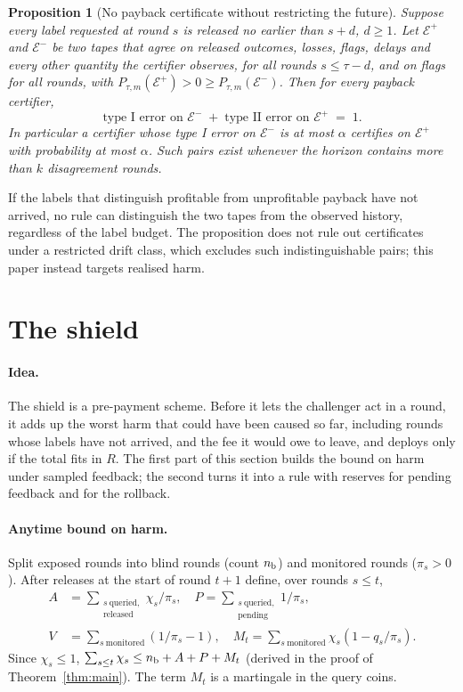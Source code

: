 \documentclass[10pt]{article}
\theoremstyle{plain}
\newtheorem{proposition}{Proposition}
\theoremstyle{definition}
\begin{document}
\begin{samepage}
\begin{proposition}[No payback certificate without restricting the future]\label{prop:nocert}
Suppose every label requested at round $s$ is released no earlier than $s+d$, $d\ge1$. Let $\mathcal E^+$ and $\mathcal E^-$ be two tapes that agree on released outcomes, losses, flags, delays and every other quantity the certifier observes, for all rounds $s\le\tau-d$, and on flags for all rounds, with $P_{\tau,m}(\mathcal E^+)>0\ge P_{\tau,m}(\mathcal E^-)$. Then for every payback certifier,
\[
\text{type I error on }\mathcal E^-\;+\;\text{type II error on }\mathcal E^+\;=\;1 .
\]
In particular a certifier whose type I error on $\mathcal E^-$ is at most $\alpha$ certifies on $\mathcal E^+$ with probability at most $\alpha$. Such pairs exist whenever the horizon contains more than $k$ disagreement rounds.
\end{proposition}
\end{samepage}
If the labels that distinguish profitable from unprofitable payback have not arrived, no rule can distinguish the two tapes from the observed history, regardless of the label budget. The proposition does not rule out certificates under a restricted drift class, which excludes such indistinguishable pairs; this paper instead targets realised harm.

\section{The shield}\label{sec:method}
\paragraph{Idea.}
The shield is a pre-payment scheme. Before it lets the challenger act in a round, it adds up the worst harm that could have been caused so far, including rounds whose labels have not arrived, and the fee it would owe to leave, and deploys only if the total fits in $R$. The first part of this section builds the bound on harm under sampled feedback; the second turns it into a rule with reserves for pending feedback and for the rollback.

\paragraph{Anytime bound on harm.}
Split exposed rounds into blind rounds (count $n_{\rm b}$) and monitored rounds ($\pi_s>0$). After releases at the start of round $t+1$ define, over rounds $s\le t$,
{\small\begin{align*}
A&=\sum_{\substack{s\ \text{queried,}\\ \text{released}}}\!\chi_s/\pi_s,\quad
P=\sum_{\substack{s\ \text{queried,}\\ \text{pending}}}\!1/\pi_s,\\
V&=\sum_{s\ \text{monitored}}(1/\pi_s-1),\quad
M_t=\sum_{s\ \text{monitored}}\chi_s(1-q_s/\pi_s).
\end{align*}}
Since $\chi_s\le1$, $\sum_{s\le t}\chi_s\le n_{\rm b}+A+P+M_t$ (derived in the proof of Theorem~\ref{thm:main}). The term $M_t$ is a martingale in the query coins.
\end{document}
